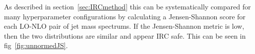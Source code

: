 \begin{figure}[htp]
\end{figure}    

%
%

As described in section~\ref{sec:IRCmethod} this can be systematically compared for many hyperparameter configurations by calculating a Jensen-Shannon
score for each LO-NLO pair of jet mass spectrums.
If the Jensen-Shannon metric is low, then the two distributions are similar and appear IRC safe.
This can be seen in fig~\ref{fig:unnormedJS}.

